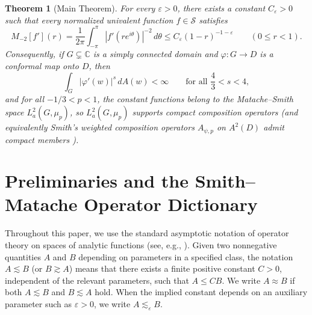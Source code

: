\documentclass[12pt]{article}
\def\C{\mathbb{C}}
\def\S{\mathcal{S}}
\newtheorem{thm}{Theorem}[section]
\theoremstyle{definition}
\numberwithin{equation}{section}
\begin{document}
\begin{thm}[Main Theorem]\label{thm:main}
For every $\varepsilon > 0$, there exists a constant $C_\varepsilon > 0$ such that every normalized univalent function $f \in \S$ satisfies
\begin{equation}\label{eq:main-means-bound}
  M_{-2}[f'](r) = \frac{1}{2\pi} \int_{-\pi}^{\pi} |f'(r e^{i\theta})|^{-2} \, d\theta \le C_\varepsilon (1-r)^{-1-\varepsilon} \qquad (0 \le r < 1).
\end{equation}
Consequently, if $G \subsetneq \C$ is a simply connected domain and $\varphi : G \to D$ is a conformal map onto $D$, then
\begin{equation}\label{eq:main-brennan-bound}
  \int_G |\varphi'(w)|^s \, dA(w) < \infty \qquad \text{for all } \frac{4}{3} < s < 4,
\end{equation}
and for all $-1/3 < p < 1$, the constant functions belong to the Matache--Smith space $L^2_a(G, \mu_p)$, so $L^2_a(G, \mu_p)$ supports compact composition operators (and equivalently Smith's weighted composition operators $A_{\psi, p}$ on $A^2(D)$ admit compact members \cite{Smi06, MS12}).
\end{thm}

\section{Preliminaries and the Smith--Matache Operator Dictionary}

Throughout this paper, we use the standard asymptotic notation of operator theory on spaces of analytic functions (see, e.g., \cite{Smi06, MS12, CKS25}). Given two nonnegative quantities $A$ and $B$ depending on parameters in a specified class, the notation $A \lesssim B$ (or $B \gtrsim A$) means that there exists a finite positive constant $C > 0$, independent of the relevant parameters, such that $A \le C B$. We write $A \approx B$ if both $A \lesssim B$ and $B \lesssim A$ hold. When the implied constant depends on an auxiliary parameter such as $\varepsilon > 0$, we write $A \lesssim_\varepsilon B$.
\end{document}
